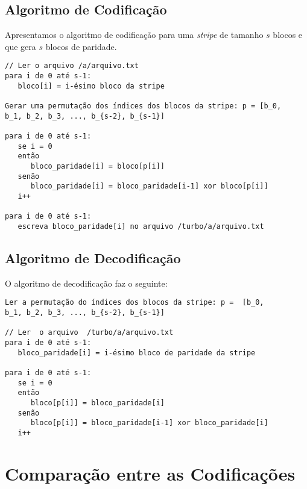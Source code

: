 \subsection{Algoritmo de Codificação}

Apresentamos o algoritmo de codificação para uma \emph{stripe} de tamanho $s$ blocos e que gera $s$ blocos de paridade.

\begin{verbatim}
// Ler o arquivo /a/arquivo.txt
para i de 0 até s-1:
   bloco[i] = i-ésimo bloco da stripe

Gerar uma permutação dos índices dos blocos da stripe: p = [b_0,
b_1, b_2, b_3, ..., b_{s-2}, b_{s-1}]

para i de 0 até s-1:
   se i = 0
   então
      bloco_paridade[i] = bloco[p[i]]
   senão
      bloco_paridade[i] = bloco_paridade[i-1] xor bloco[p[i]]
   i++

para i de 0 até s-1:
   escreva bloco_paridade[i] no arquivo /turbo/a/arquivo.txt
\end{verbatim}

\subsection{Algoritmo de Decodificação}

O algoritmo de decodificação faz o seguinte:

\begin{verbatim}
Ler a permutação do índices dos blocos da stripe: p =  [b_0,
b_1, b_2, b_3, ..., b_{s-2}, b_{s-1}]

// Ler  o arquivo  /turbo/a/arquivo.txt
para i de 0 até s-1:
   bloco_paridade[i] = i-ésimo bloco de paridade da stripe

para i de 0 até s-1:
   se i = 0
   então
      bloco[p[i]] = bloco_paridade[i]
   senão
      bloco[p[i]] = bloco_paridade[i-1] xor bloco_paridade[i]
   i++
\end{verbatim}

\section{Comparação entre as Codificações}


